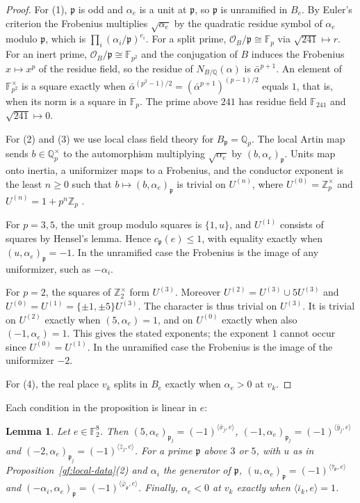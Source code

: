 \documentclass[11pt]{amsart}
\numberwithin{equation}{section}
\newtheorem{lemma}[equation]{Lemma}
\theoremstyle{definition}
\theoremstyle{remark}
\newcommand{\Ftwo}{\mathbb F_2}
\newcommand{\Q}{\mathbb Q}
\begin{document}
\begin{proof}
For (1), $\mathfrak p$ is odd and $\alpha_e$ is a unit at $\mathfrak p$, so
$\mathfrak p$ is unramified in $B_e$. By Euler's criterion the Frobenius
multiplies $\sqrt{\alpha_e}$ by the quadratic residue symbol of $\alpha_e$
modulo $\mathfrak p$, which is $\prod_i(\alpha_i/\mathfrak p)^{e_i}$. For a
split prime, $\mathcal O_B/\mathfrak p\cong\mathbb F_p$ via $\sqrt{241}\mapsto
r$. For an inert prime, $\mathcal O_B/\mathfrak p\cong\mathbb F_{p^2}$ and
the conjugation of $B$ induces the Frobenius $x\mapsto x^p$ of the residue
field, so the residue of $N_{B/\Q}(\alpha)$ is $\bar\alpha^{p+1}$. An element
of $\mathbb F_{p^2}^\times$ is a square exactly when
$\bar\alpha^{(p^2-1)/2}=(\bar\alpha^{p+1})^{(p-1)/2}$ equals $1$, that is,
when its norm is a square in $\mathbb F_p$. The prime above $241$ has
residue field $\mathbb F_{241}$ and $\sqrt{241}\mapsto0$.

For (2) and (3) we use local class field theory for $B_{\mathfrak p}=\Q_p$.
The local Artin map sends $b\in\Q_p^\times$ to the automorphism multiplying
$\sqrt{\alpha_e}$ by $(b,\alpha_e)_{\mathfrak p}$. Units map onto inertia, a
uniformizer maps to a Frobenius, and the conductor exponent is the least
$n\ge0$ such that $b\mapsto(b,\alpha_e)_{\mathfrak p}$ is trivial on
$U^{(n)}$, where $U^{(0)}=\mathbb Z_p^\times$ and $U^{(n)}=1+p^n\mathbb Z_p$
\cite{MilneCFT}.

For $p=3,5$, the unit group modulo squares is $\{1,u\}$, and $U^{(1)}$
consists of squares by Hensel's lemma. Hence $c_{\mathfrak p}(e)\le1$, with
equality exactly when $(u,\alpha_e)_{\mathfrak p}=-1$. In the unramified
case the Frobenius is the image of any uniformizer, such as $-\alpha_i$.

For $p=2$, the squares of $\mathbb Z_2^\times$ form $U^{(3)}$. Moreover
$U^{(2)}=U^{(3)}\cup5U^{(3)}$ and
$U^{(0)}=U^{(1)}=\{\pm1,\pm5\}U^{(3)}$. The character is thus trivial on
$U^{(3)}$. It is trivial on $U^{(2)}$ exactly when $(5,\alpha_e)=1$, and
on $U^{(0)}$ exactly when also $(-1,\alpha_e)=1$. This gives the stated
exponents; the exponent $1$ cannot occur since $U^{(0)}=U^{(1)}$. In the
unramified case the Frobenius is the image of the uniformizer $-2$.

For (4), the real place $v_k$ splits in $B_e$ exactly when $\alpha_e>0$ at
$v_k$.
\end{proof}

Each condition in the proposition is linear in $e$:

\begin{lemma}\label{gf:linear}
Let $e\in\Ftwo^8$. Then
$(5,\alpha_e)_{\mathfrak p_j}=(-1)^{\langle\bar x_j,e\rangle}$,
$(-1,\alpha_e)_{\mathfrak p_j}=(-1)^{\langle\bar y_j,e\rangle}$ and
$(-2,\alpha_e)_{\mathfrak p_j}=(-1)^{\langle\bar z_j,e\rangle}$. For a prime
$\mathfrak p$ above $3$ or $5$, with $u$ as in
Proposition~\ref{gf:local-data}(2) and $\alpha_i$ the generator of
$\mathfrak p$,
$(u,\alpha_e)_{\mathfrak p}=(-1)^{\langle\bar\tau_{\mathfrak p},e\rangle}$ and
$(-\alpha_i,\alpha_e)_{\mathfrak p}=(-1)^{\langle\bar\varphi_{\mathfrak p},e\rangle}$.
Finally, $\alpha_e<0$ at $v_k$ exactly when $\langle\bar\iota_k,e\rangle=1$.
\end{lemma}
\end{document}
